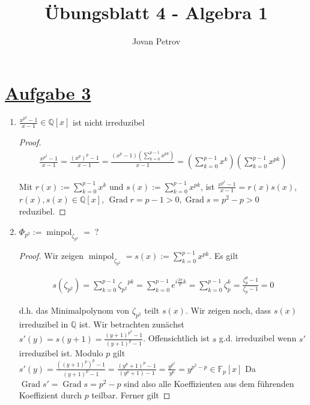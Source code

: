 \documentclass[a4paper]{article}
\DeclareMathOperator{\Grad}{Grad}
\DeclareMathOperator{\minpol}{minpol}
\newcommand{\zps}{\zeta_{p^2}}
\newcommand{\zp}{\zeta_{p}}
\begin{document}
	\title{\"Ubungsblatt 4 - Algebra 1}
	\author{Jovan Petrov}
	\maketitle
	
	\vspace{3em}
	
	\section*{\underline{Aufgabe 3}}
	
	\begin{enumerate}
	\item $\frac{x^{p^2}-1}{x-1} \in \mathbb{Q}[x]$ ist nicht irreduzibel
	
	
	\begin{proof}
	\begin{align*}
  	\frac{x^{p^2}-1}{x-1} = \frac{(x^{p})^p-1}{x-1} = \frac{(x^p-1)\left(\sum_{k=0}^{p-1} x^{pk}\right)}{x-1} = \left(\sum_{k=0}^{p-1} x^k\right)\left(\sum_{k=0}^{p-1} x^{pk}\right)
	\end{align*}
	
	\noindent Mit $r(x):=\sum_{k=0}^{p-1} x^k$ und $s(x):=\sum_{k=0}^{p-1} x^{pk}$, ist $\frac{x^{p^2}-1}{x-1} = r(x)s(x)$,
	$r(x),s(x) \in \mathbb{Q}[x]$, $\Grad r = p-1 > 0, \Grad s = p^2-p > 0$ reduzibel.
	
	\end{proof}
	
	\item $\Phi_{p^2} := \minpol_{\zeta_{p^2}} = \; ?$
	
	\begin{proof}
	Wir zeigen $\minpol_{\zeta_{p^2}} = s(x):= \sum_{k=0}^{p-1} x^{pk}$. Es gilt
	
	\begin{align*}
  	s(\zps) =\sum_{k=0}^{p-1} {\zps}^{pk} = \sum_{k=0}^{p-1} e^{i\frac{2\pi}{p}k} = \sum_{k=0}^{p-1} \zp^k = \frac{\zp^p-1}{\zp-1} = 0
	\end{align*}

	d.h. das Minimalpolynom von $\zps$ teilt $s(x)$. Wir zeigen noch, dass $s(x)$ irreduzibel in $\mathbb{Q}$ ist. 
	Wir betrachten zun\"achst $s'(y)=s(y+1)=\frac{(y+1)^{p^2}-1}{(y+1)^p-1}$. Offensichtlich ist $s$ g.d. irreduzibel wenn $s'$ irreduzibel ist.
	Modulo $p$ gilt $s'(y) = \frac{((y+1)^{p})^p-1}{(y+1)^p-1} = \frac{(y^p+1)^p-1}{(y^p+1)-1} = \frac{y^{p^2}}{y^p} = y^{p^2-p} \in \mathbb{F}_p[x]$
	Da $\Grad s' = \Grad s = p^2-p$ sind also alle Koeffizienten aus dem f\"uhrenden Koeffizient durch $p$ teilbar. Ferner gilt


\end{proof}
\end{enumerate}
\end{document}
